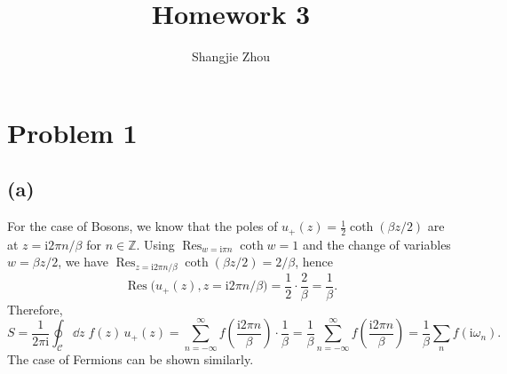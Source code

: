 \documentclass{article}
\title{Homework 3}
\author{Shangjie Zhou}
\newcommand{\ii}{\mathrm{i}}
\begin{document}
\maketitle


\section*{Problem 1}
\subsection*{(a)}
For the case of Bosons, we know that the poles of $u_+(z)=\tfrac{1}{2}\coth(\beta z/2)$ are at $z=\ii 2\pi n/\beta$ for $n\in \mathbb{Z}$. Using $\operatorname*{Res}_{w=\ii\pi n}\coth w=1$ and the change of variables $w=\beta z/2$, we have $\operatorname*{Res}_{z=\ii 2\pi n/\beta}\coth(\beta z/2)=2/\beta$, hence
\begin{equation}
    \operatorname*{Res}\big(u_+(z), z=\ii 2\pi n/\beta\big) = \frac{1}{2}\cdot\frac{2}{\beta} = \frac{1}{\beta}.
\end{equation}
Therefore,
\begin{equation}
    S=\frac{1}{2\pi\ii}\oint_\mathcal{C}\dd{z}\; f(z)\,u_+(z)=\sum_{n=-\infty}^{\infty} f\!\left(\frac{\ii 2\pi n}{\beta}\right)\cdot \frac{1}{\beta} = \frac{1}{\beta}\sum_{n=-\infty}^{\infty} f\!\left(\frac{\ii 2\pi n}{\beta}\right)=\frac{1}{\beta}\sum_n f(\ii\omega_n).
\end{equation}
The case of Fermions can be shown similarly.
\end{document}
